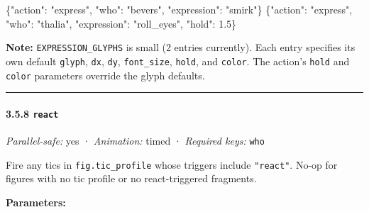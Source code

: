 \documentclass[
  12pt,
  letterpaper,
]{book}
\newenvironment{Shaded}{}{}
\newcommand{\DataTypeTok}[1]{\textcolor[rgb]{0.56,0.13,0.00}{#1}}
\newcommand{\FloatTok}[1]{\textcolor[rgb]{0.25,0.63,0.44}{#1}}
\newcommand{\FunctionTok}[1]{\textcolor[rgb]{0.02,0.16,0.49}{#1}}
\newcommand{\StringTok}[1]{\textcolor[rgb]{0.25,0.44,0.63}{#1}}
\begin{document}
\begin{Shaded}
\begin{Highlighting}[]
\FunctionTok{\{}\DataTypeTok{"action"}\FunctionTok{:} \StringTok{"express"}\FunctionTok{,} \DataTypeTok{"who"}\FunctionTok{:} \StringTok{"bevers"}\FunctionTok{,} \DataTypeTok{"expression"}\FunctionTok{:} \StringTok{"smirk"}\FunctionTok{\}}
\FunctionTok{\{}\DataTypeTok{"action"}\FunctionTok{:} \StringTok{"express"}\FunctionTok{,} \DataTypeTok{"who"}\FunctionTok{:} \StringTok{"thalia"}\FunctionTok{,} \DataTypeTok{"expression"}\FunctionTok{:} \StringTok{"roll\_eyes"}\FunctionTok{,} \DataTypeTok{"hold"}\FunctionTok{:} \FloatTok{1.5}\FunctionTok{\}}
\end{Highlighting}
\end{Shaded}

\textbf{Note:} \texttt{EXPRESSION\_GLYPHS} is small (2 entries
currently). Each entry specifies its own default \texttt{glyph},
\texttt{dx}, \texttt{dy}, \texttt{font\_size}, \texttt{hold}, and
\texttt{color}. The action's \texttt{hold} and \texttt{color} parameters
override the glyph defaults.

\begin{center}\rule{0.5\linewidth}{0.5pt}\end{center}

\paragraph{\texorpdfstring{3.5.8
\texttt{react}}{3.5.8 react}}\label{react}

\emph{Parallel-safe:} yes · \emph{Animation:} timed · \emph{Required
keys:} \texttt{who}

Fire any tics in \texttt{fig.tic\_profile} whose triggers include
\texttt{"react"}. No-op for figures with no tic profile or no
react-triggered fragments.

\textbf{Parameters:}
\end{document}
